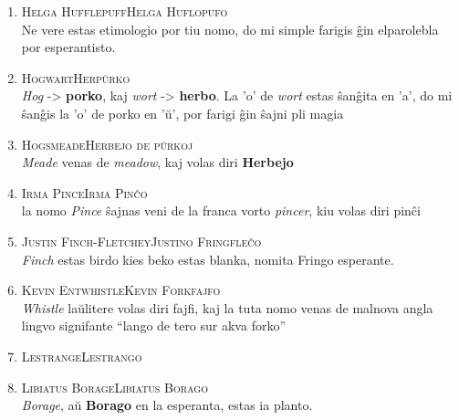 \begin{enumerate}
\item\label{nomoj:huflopufo} \textsc{Helga Hufflepuff}\dotfill \textsc{Helga Huflopufo}\\
{\footnotesize \indent Ne vere estas etimologio por tiu nomo, do mi simple farigis ĝin elparolebla por esperantisto.}
\smallskip

\item\label{nomoj:herpŭrko} \textsc{Hogwart}\dotfill \textsc{Herpŭrko}\\
{\footnotesize \indent \textit{Hog} -> \textbf{porko}, kaj \textit{wort} ->
\textbf{herbo}. La 'o' de \textit{wort} estas ŝanĝita en 'a', do mi
ŝanĝis la 'o' de porko en 'ŭ', por farigi ĝin ŝajni pli magia}
\smallskip

\item\label{nomoj:herbejo-pŭrko} \textsc{Hogsmeade}\dotfill \textsc{Herbejo de pŭrkoj}\\
{\footnotesize \indent \textit{Meade} venas de \emph{meadow}, kaj volas diri \textbf{Herbejo}}
\smallskip

\item\label{nomoj:pinĉo} \textsc{Irma Pince}\dotfill \textsc{Irma Pinĉo}\\
{\footnotesize \indent la nomo \emph{Pince} ŝajnas veni de la franca vorto \textit{pincer}, kiu volas diri pinĉi}

\item\label{nomoj:fringfleĉo} \textsc{Justin Finch-Fletchey}\dotfill \textsc{Justino Fringfleĉo}\\
{\footnotesize \indent \emph{Finch} estas birdo kies beko estas blanka, nomita Fringo esperante.}
\smallskip

\item\label{nomoj:forkfajo} \textsc{Kevin Entwhistle}\dotfill \textsc{Kevin Forkfajfo}\\
{\footnotesize \indent \emph{Whistle} laŭlitere volas diri fajfi, kaj
  la tuta nomo venas de malnova angla lingvo signifante ``lango de tero
  sur akva forko''} \smallskip

\item\label{nomoj:lestrango} \textsc{Lestrange}\dotfill \textsc{Lestrango}\\
\smallskip

\item\label{nomoj:borago} \textsc{Libiatus Borage}\dotfill \textsc{Libiatus Borago}\\
{\footnotesize \indent \emph{Borage}, aŭ \textbf{Borago} en la esperanta, estas ia planto.}
\smallskip


\end{enumerate}
